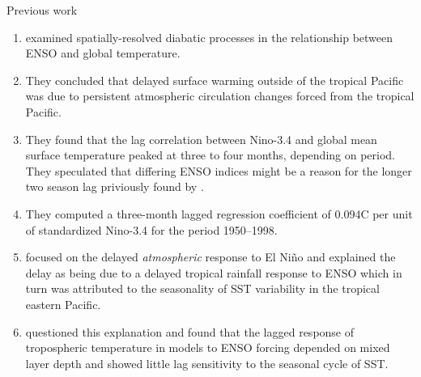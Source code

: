 \documentclass[aspectratio=169,xcolor=dvipsnames]{beamer}
\begin{document}
\begin{frame}[allowframebreaks]{Previous work}
\begin{enumerate}
  \end{enumerate}
  \newpage
  \begin{enumerate}
  \item \citet{Trenberth2002evolution} examined spatially-resolved
    diabatic processes in the relationship between ENSO and global
    temperature.

  \item They concluded that delayed surface warming outside of the
    tropical Pacific was due to persistent atmospheric circulation
    changes forced from the tropical Pacific.
    
  \item They found that the lag correlation between Nino-3.4 and
    global mean surface temperature peaked at three to four months,
    depending on period. They speculated that differing ENSO indices
    might be a reason for the longer two season lag priviously found
    by \citet{Angell1981comparison}.

  \item They computed a three-month lagged regression coefficient of
    0.094\textdegree C per unit of standardized Nino-3.4 for the
    period 1950--1998.

  \item \citet{Kumar2003nature} focused on the delayed
    \textit{atmospheric} response to El Ni\~no and explained the delay
    as being due to a delayed tropical rainfall response to ENSO which
    in turn was attributed to the seasonality of SST variability in the
    tropical eastern Pacific.

  \item \citet{Su2005mechanisms} questioned this explanation and found
    that the lagged response of tropospheric temperature in models to
    ENSO forcing depended on mixed layer depth and showed little lag
    sensitivity to the seasonal cycle of SST.

    



\end{enumerate}
\end{frame}
\end{document}

